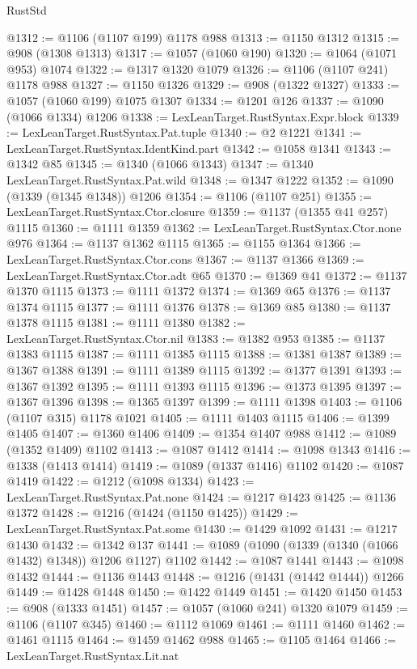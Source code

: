 \begin{lexlean}{RustStd}
\begin{coremodule}
@1312 := @1106 (@1107 @199) @1178 @988
@1313 := @1150 @1312
@1315 := @908 (@1308 @1313)
@1317 := @1057 (@1060 @190)
@1320 := @1064 (@1071 @953) @1074
@1322 := @1317 @1320 @1079
@1326 := @1106 (@1107 @241) @1178 @988
@1327 := @1150 @1326
@1329 := @908 (@1322 @1327)
@1333 := @1057 (@1060 @199) @1075 @1307
@1334 := @1201 @126
@1337 := @1090 (@1066 @1334) @1206
@1338 := LexLeanTarget.RustSyntax.Expr.block
@1339 := LexLeanTarget.RustSyntax.Pat.tuple
@1340 := @2 @1221
@1341 := LexLeanTarget.RustSyntax.IdentKind.part
@1342 := @1058 @1341
@1343 := @1342 @85
@1345 := @1340 (@1066 @1343)
@1347 := @1340 LexLeanTarget.RustSyntax.Pat.wild
@1348 := @1347 @1222
@1352 := @1090 (@1339 (@1345 @1348)) @1206
@1354 := @1106 (@1107 @251)
@1355 := LexLeanTarget.RustSyntax.Ctor.closure
@1359 := @1137 (@1355 @41 @257) @1115
@1360 := @1111 @1359
@1362 := LexLeanTarget.RustSyntax.Ctor.none @976
@1364 := @1137 @1362 @1115
@1365 := @1155 @1364
@1366 := LexLeanTarget.RustSyntax.Ctor.cons
@1367 := @1137 @1366
@1369 := LexLeanTarget.RustSyntax.Ctor.adt @65
@1370 := @1369 @41
@1372 := @1137 @1370 @1115
@1373 := @1111 @1372
@1374 := @1369 @65
@1376 := @1137 @1374 @1115
@1377 := @1111 @1376
@1378 := @1369 @85
@1380 := @1137 @1378 @1115
@1381 := @1111 @1380
@1382 := LexLeanTarget.RustSyntax.Ctor.nil
@1383 := @1382 @953
@1385 := @1137 @1383 @1115
@1387 := @1111 @1385 @1115
@1388 := @1381 @1387
@1389 := @1367 @1388
@1391 := @1111 @1389 @1115
@1392 := @1377 @1391
@1393 := @1367 @1392
@1395 := @1111 @1393 @1115
@1396 := @1373 @1395
@1397 := @1367 @1396
@1398 := @1365 @1397
@1399 := @1111 @1398
@1403 := @1106 (@1107 @315) @1178 @1021
@1405 := @1111 @1403 @1115
@1406 := @1399 @1405
@1407 := @1360 @1406
@1409 := @1354 @1407 @988
@1412 := @1089 (@1352 @1409) @1102
@1413 := @1087 @1412
@1414 := @1098 @1343
@1416 := @1338 (@1413 @1414)
@1419 := @1089 (@1337 @1416) @1102
@1420 := @1087 @1419
@1422 := @1212 (@1098 @1334)
@1423 := LexLeanTarget.RustSyntax.Pat.none
@1424 := @1217 @1423
@1425 := @1136 @1372
@1428 := @1216 (@1424 (@1150 @1425))
@1429 := LexLeanTarget.RustSyntax.Pat.some
@1430 := @1429 @1092
@1431 := @1217 @1430
@1432 := @1342 @137
@1441 := @1089 (@1090 (@1339 (@1340 (@1066 @1432) @1348)) @1206 @1127) @1102
@1442 := @1087 @1441
@1443 := @1098 @1432
@1444 := @1136 @1443
@1448 := @1216 (@1431 (@1442 @1444)) @1266
@1449 := @1428 @1448
@1450 := @1422 @1449
@1451 := @1420 @1450
@1453 := @908 (@1333 @1451)
@1457 := @1057 (@1060 @241) @1320 @1079
@1459 := @1106 (@1107 @345)
@1460 := @1112 @1069
@1461 := @1111 @1460
@1462 := @1461 @1115
@1464 := @1459 @1462 @988
@1465 := @1105 @1464
@1466 := LexLeanTarget.RustSyntax.Lit.nat

\end{coremodule}
\end{lexlean}
